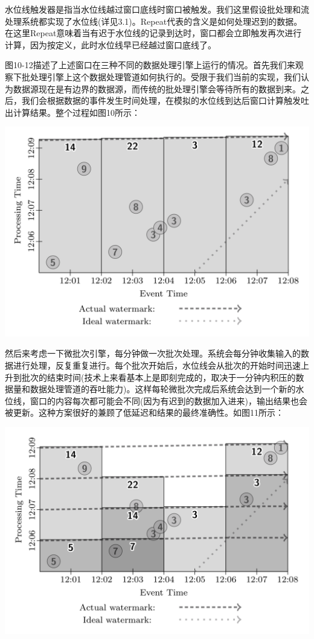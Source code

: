 \documentclass[oneside]{ctexbook}
\begin{document}
水位线触发器是指当水位线越过窗口底线时窗口被触发。我们这里假设批处理和流处理系统都实现了水位线(详见3.1)。Repeat代表的含义是如何处理迟到的数据。在这里Repeat意味着当有迟于水位线的记录到达时，窗口都会立即触发再次进行计算，因为按定义，此时水位线早已经越过窗口底线了。

图10-12描述了上述窗口在三种不同的数据处理引擎上运行的情况。首先我们来观察下批处理引擎上这个数据处理管道如何执行的。受限于我们当前的实现，我们认为数据源现在是有边界的数据源，而传统的批处理引擎会等待所有的数据到来。之后，我们会根据数据的事件发生时间处理，在模拟的水位线到达后窗口计算触发吐出计算结果。整个过程如图10所示：

\noindent \includegraphics[width=\textwidth]{fixedwindowsbatch.png}

然后来考虑一下微批次引擎，每分钟做一次批次处理。系统会每分钟收集输入的数据进行处理，反复重复进行。每个批次开始后，水位线会从批次的开始时间迅速上升到批次的结束时间(技术上来看基本上是即刻完成的，取决于一分钟内积压的数据量和数据处理管道的吞吐能力)。这样每轮微批次完成后系统会达到一个新的水位线，窗口的内容每次都可能会不同(因为有迟到的数据加入进来)，输出结果也会被更新。这种方案很好的兼顾了低延迟和结果的最终准确性。如图11所示：

\noindent \includegraphics[width=\textwidth]{fixedwindowsmicrobatch.png}
\end{document}
